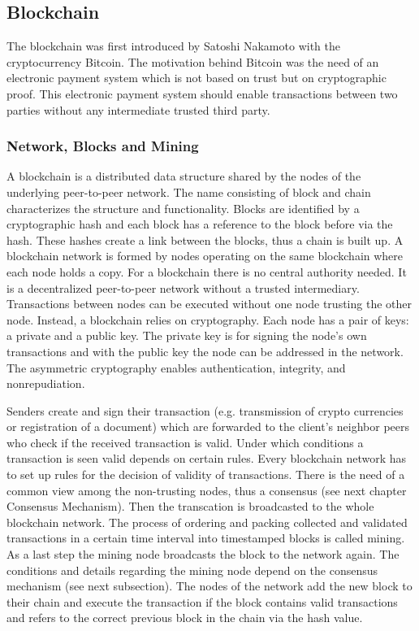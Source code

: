 \documentclass[conference]{IEEEtran}
\begin{document}
\subsection{Blockchain}
The blockchain was first introduced by Satoshi Nakamoto with the cryptocurrency Bitcoin. The motivation behind Bitcoin was the need of an electronic payment system which is not based on trust but on cryptographic proof. This electronic payment system should enable transactions between two parties without any intermediate trusted third party. \cite{Nakamoto2008}
\subsubsection{Network, Blocks and Mining}
A blockchain is a distributed data structure shared by the nodes of the underlying peer-to-peer network. The name consisting of block and chain characterizes the structure and functionality. Blocks are identified by a cryptographic hash and each block has a reference to the block before via the hash. These hashes create a link between the blocks, thus a chain is built up. A blockchain network is formed by nodes operating on the same blockchain where each node holds a copy. For a blockchain there is no central authority needed. It is a decentralized peer-to-peer network without a trusted intermediary. Transactions between nodes can be executed without one node trusting the other node. Instead, a blockchain relies on cryptography. Each node has a pair of keys: a private and a public key. The private key is for signing the node's own transactions and with the public key the node can be addressed in the network. The asymmetric cryptography enables authentication, integrity, and nonrepudiation.  \cite{Christidis2016} \par
Senders create and sign their transaction (e.g. transmission of crypto currencies or registration of a document) which are forwarded to the client's neighbor peers who check if the received transaction is valid. Under which conditions a transaction is seen valid depends on certain rules. Every blockchain network has to set up rules for the decision of validity of transactions. There is the need of a common view among the non-trusting nodes, thus a consensus (see next chapter Consensus Mechanism). Then the transcation is broadcasted to the whole blockchain network. The process of ordering and packing collected and validated transactions in a certain time interval into timestamped blocks is called mining. As a last step the mining node broadcasts the block to the network again. The conditions and details regarding the mining node depend on the consensus mechanism (see next subsection). The nodes of the network add the new block to their chain and execute the transaction if the block contains valid transactions and refers to the correct previous block in the chain via the hash value. \cite{Christidis2016} \cite{Prinz2017} \par
\end{document}
